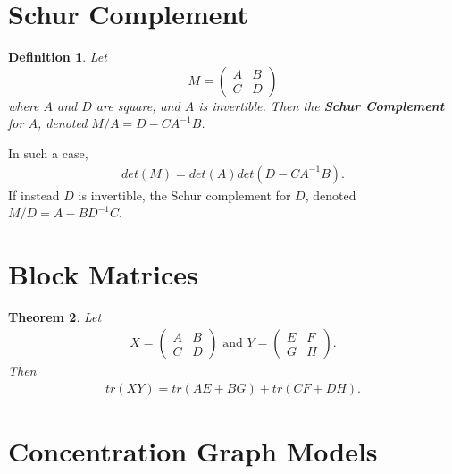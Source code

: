 \documentclass[12pt, leqno]{article}
\newtheorem{thm}{Theorem}[]
\newtheorem{defn}[thm]{Definition}
\begin{document}
\section{Schur Complement} 
\begin{defn}
Let 
\[
M = \begin{pmatrix}
A&B\\ C&D
\end{pmatrix}
\]
where $A$ and $D$ are square, and $A$ is invertible. Then the \textbf{Schur
Complement} for $A$, denoted $M/A = D-CA^{-1}B$. 
\end{defn}
In such a case,
\begin{align}
\label{eq:schurdet}
det(M) = det(A)det(D-CA^{-1}B).
\end{align} 
If instead $D$ is invertible, the Schur
complement for $D$, denoted $M/D = A-BD^{-1}C$.
\section{Block Matrices} 
\begin{thm}
\label{thm:blocktrace}
Let 
\begin{align*}
X = \begin{pmatrix}
A&B\\ C&D
\end{pmatrix}
\text{ and } 
Y = \begin{pmatrix}
E&F\\ G&H
\end{pmatrix}.
\end{align*} 
Then
\begin{align*}
tr(XY) = tr(AE+BG) + tr(CF+DH).
\end{align*} 
\end{thm}

\section{Concentration Graph Models}
\end{document}
